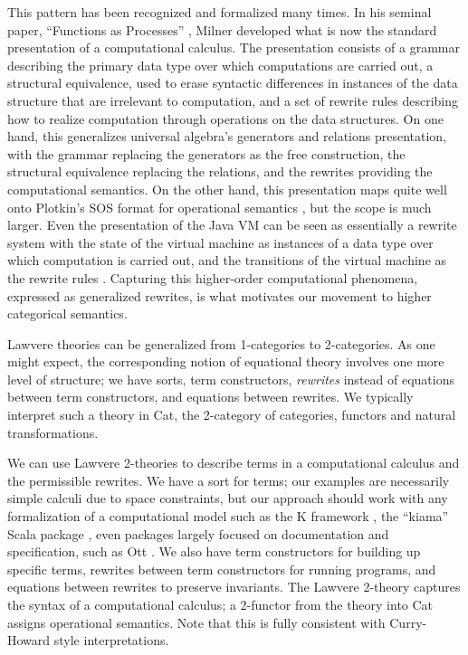 \documentclass{llncs}
\begin{document}
  This pattern has been recognized and formalized many times.  In his seminal paper, ``Functions as Processes'' \cite{DBLP:journals/mscs/Milner92}, Milner developed what is now the standard presentation of a computational calculus.  The presentation consists of a grammar describing the primary data type over which computations are carried out, a structural equivalence, used to erase syntactic differences in instances of the data structure that are irrelevant to computation, and a set of rewrite rules describing how to realize computation through operations on the data structures.  On one hand, this generalizes universal algebra's generators and relations presentation, with the grammar replacing the generators as the free construction, the structural equivalence replacing the relations, and the rewrites providing the computational semantics.  On the other hand, this presentation maps quite well onto Plotkin's SOS format for operational semantics \cite{Plotkin04theorigins}, but the scope is much larger.  Even the presentation of the Java VM can be seen as essentially a rewrite system with the state of the virtual machine as instances of a data type over which computation is carried out, and the transitions of the virtual machine as the rewrite rules  \cite{DBLP:conf/oopsla/IgarashiPW99}.  Capturing this higher-order computational phenomena, expressed as generalized rewrites, is what motivates our movement to higher categorical semantics.

  Lawvere theories can be generalized from  1-categories to 2-categories.  As one might expect, the corresponding notion of equational theory involves one more level of structure; we have sorts, term constructors, {\em rewrites} instead of equations between term constructors, and equations between rewrites.  We typically interpret such a theory in Cat, the  2-category of categories, functors and natural transformations.

  We can use Lawvere 2-theories to describe terms in a computational calculus and the permissible rewrites.  We have a sort for terms;  our examples are necessarily simple calculi due to space constraints, but our approach should work with any formalization of a computational model such as the K framework \cite{DBLP:journals/jlp/RosuS10}, the  ``kiama'' Scala package \cite{DBLP:conf/gttse/Sloane09}, even packages largely focused on documentation and specification, such as Ott  \cite{DBLP:journals/jfp/SewellNOPRSS10}.  We also have term constructors for building up specific terms, rewrites between term constructors for running programs, and equations between rewrites to preserve invariants.  The Lawvere 2-theory captures the syntax of a computational calculus; a 2-functor from the theory into Cat assigns operational semantics.  Note that this is fully consistent with Curry-Howard style interpretations.
\end{document}
